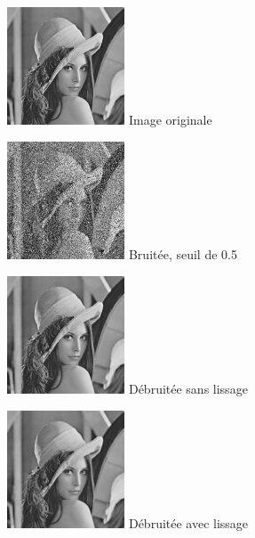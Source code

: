 \documentclass{article}
\begin{document}
		\begin{figure}[!ht]
			\centering
			\begin{minipage}[t]{3.5cm}
				\centering
				\includegraphics[width=3.5cm,height=3.5cm]{lena.jpg}
				Image originale
			\end{minipage}
			\begin{minipage}[t]{3.5cm}
				\centering
				\includegraphics[width=3.5cm,height=3.5cm]{SaltAndPepper/noisy_50.jpg}
				Bruitée, seuil de 0.5
			\end{minipage}
			\begin{minipage}[t]{3.5cm}
				\centering
				\includegraphics[width=3.5cm,height=3.5cm]{SaltAndPepper/algo1_50.jpg}
				Débruitée sans lissage
			\end{minipage}
			\begin{minipage}[t]{3.5cm}
				\centering
				\includegraphics[width=3.5cm,height=3.5cm]{SaltAndPepper/algo2_50.jpg}
				Débruitée avec lissage
			\end{minipage}
		\end{figure}
		
\end{document}
